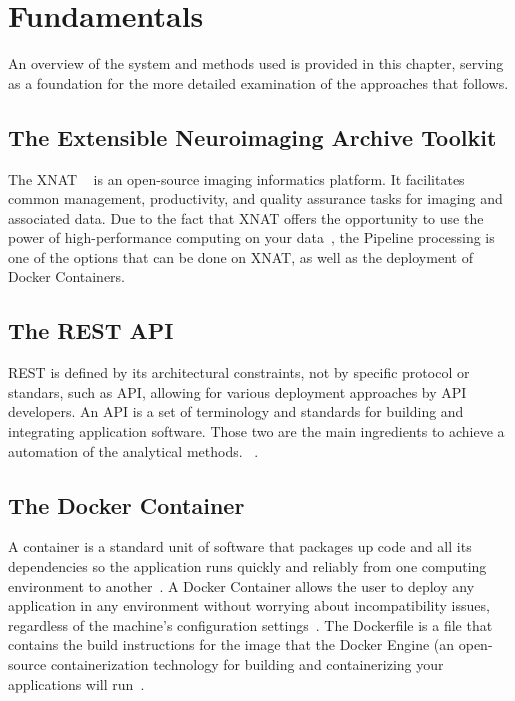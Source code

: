 
\chapter{Fundamentals}

An overview of the system and methods used is provided in this chapter, serving as a foundation for the more detailed examination of the approaches that follows. 

\section{The Extensible Neuroimaging Archive Toolkit}
The \ac{XNAT} ~\cite{marcus_extensible_2007} is an open-source imaging informatics platform. It facilitates common management, productivity, and quality assurance tasks for imaging and associated data. Due to the fact that XNAT offers the opportunity to use the power of high-performance computing on your data~\cite{zaschke_extending_2024}, 
 the Pipeline processing is one of the options that can be done on XNAT, as well as the deployment of Docker Containers.


\section{The REST API}
\ac{REST} is defined by its architectural constraints, not by specific protocol or standars, such as API, allowing for various deployment approaches by API developers.
An \ac{API} is a set of terminology and standards for building and integrating application software. Those two are the main ingredients to achieve a automation of the analytical methods.
 ~\cite{REST_API}.

\section{The Docker Container}
A container is a standard unit of software that packages up code and all its dependencies so the application runs quickly and reliably from one computing environment to another~\cite{DockerContainer}.
A Docker Container allows the user to deploy any application in any environment without worrying about incompatibility issues, regardless of the machine’s configuration settings~\cite{what_is_Docker_Container}. The Dockerfile is a file that contains the build instructions for the image that the Docker Engine (an open-source containerization technology for building and containerizing your applications will run~\cite{DockerEngine}.
\\
